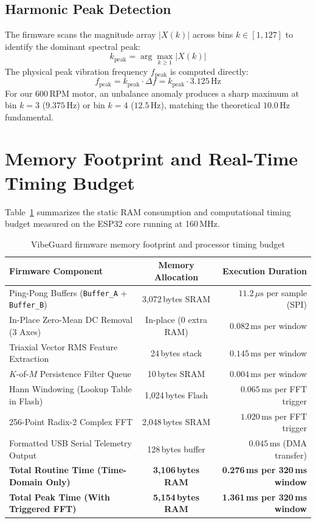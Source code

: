 \subsection{Harmonic Peak Detection}
The firmware scans the magnitude array $|X(k)|$ across bins $k \in [1, 127]$ to identify the dominant spectral peak:
\begin{equation}
k_{\mathrm{peak}} = \arg\max_{k \ge 1} |X(k)|
\end{equation}
The physical peak vibration frequency $f_{\mathrm{peak}}$ is computed directly:
\begin{equation}
f_{\mathrm{peak}} = k_{\mathrm{peak}} \cdot \Delta f = k_{\mathrm{peak}} \cdot 3.125\,\text{Hz}
\end{equation}
For our 600\,RPM motor, an unbalance anomaly produces a sharp maximum at bin $k = 3$ ($9.375$\,Hz) or bin $k = 4$ ($12.5$\,Hz), matching the theoretical $10.0$\,Hz fundamental.

\section{Memory Footprint and Real-Time Timing Budget}
Table~\ref{tab:memory_budget} summarizes the static RAM consumption and computational timing budget measured on the ESP32 core running at 160\,MHz.

\begin{table}[H]
\centering
\begin{tabular}{|l|c|r|}
\hline
\textbf{Firmware Component} & \textbf{Memory Allocation} & \textbf{Execution Duration} \\
\hline
Ping-Pong Buffers (\texttt{Buffer\_A} + \texttt{Buffer\_B}) & 3,072\,bytes SRAM & $11.2\,\mu\text{s}$ per sample (SPI) \\
In-Place Zero-Mean DC Removal (3 Axes) & In-place (0 extra RAM) & $0.082\,\text{ms}$ per window \\
Triaxial Vector RMS Feature Extraction & 24\,bytes stack & $0.145\,\text{ms}$ per window \\
$K$-of-$M$ Persistence Filter Queue & 10\,bytes SRAM & $0.004\,\text{ms}$ per window \\
Hann Windowing (Lookup Table in Flash) & 1,024\,bytes Flash & $0.065\,\text{ms}$ per FFT trigger \\
256-Point Radix-2 Complex FFT & 2,048\,bytes SRAM & $1.020\,\text{ms}$ per FFT trigger \\
Formatted USB Serial Telemetry Output & 128\,bytes buffer & $0.045\,\text{ms}$ (DMA transfer) \\
\hline
\textbf{Total Routine Time (Time-Domain Only)} & \textbf{3,106\,bytes RAM} & \textbf{0.276\,ms per 320\,ms window} \\
\textbf{Total Peak Time (With Triggered FFT)} & \textbf{5,154\,bytes RAM} & \textbf{1.361\,ms per 320\,ms window} \\
\hline
\end{tabular}
\caption{VibeGuard firmware memory footprint and processor timing budget}
\label{tab:memory_budget}
\end{table}

